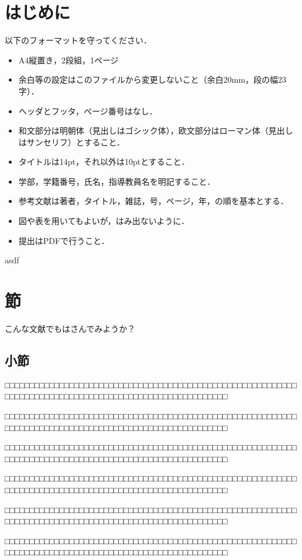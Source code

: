 

\section{はじめに}
以下のフォーマットを守ってください．
\begin{itemize}
\item
A4縦置き，2段組，1ページ
\item
余白等の設定はこのファイルから変更しないこと（余白20mm，段の幅23字）．
\item
ヘッダとフッタ，ページ番号はなし．
\item
和文部分は明朝体（見出しはゴシック体），欧文部分はローマン体（見出しはサンセリフ）とすること．
\item
タイトルは14pt，それ以外は10ptとすること．
\item
学部，学籍番号，氏名，指導教員名を明記すること．
\item
参考文献は著者，タイトル，雑誌，号，ページ，年，の順を基本とする．
\item
図や表を用いてもよいが，はみ出ないように．
\item
提出はPDFで行うこと．
\end{itemize}
asdf
\section{節}
こんな文献でもはさんでみようか\cite{Dazai}？
\subsection{小節}

□□□□□□□□□□□□□□□□□□□□□□□□□□□□□□□□□□□□□□□□□□□□□□□□□□□□□□□□□□□□□□□□□□□□□□□□□□□□□□□□□□□□□□□□□□□□□□□□□□□□□□□□

□□□□□□□□□□□□□□□□□□□□□□□□□□□□□□□□□□□□□□□□□□□□□□□□□□□□□□□□□□□□□□□□□□□□□□□□□□□□□□□□□□□□□□□□□□□□□□□□□□□□□□□□

□□□□□□□□□□□□□□□□□□□□□□□□□□□□□□□□□□□□□□□□□□□□□□□□□□□□□□□□□□□□□□□□□□□□□□□□□□□□□□□□□□□□□□□□□□□□□□□□□□□□□□□□

□□□□□□□□□□□□□□□□□□□□□□□□□□□□□□□□□□□□□□□□□□□□□□□□□□□□□□□□□□□□□□□□□□□□□□□□□□□□□□□□□□□□□□□□□□□□□□□□□□□□□□□□

□□□□□□□□□□□□□□□□□□□□□□□□□□□□□□□□□□□□□□□□□□□□□□□□□□□□□□□□□□□□□□□□□□□□□□□□□□□□□□□□□□□□□□□□□□□□□□□□□□□□□□□□

□□□□□□□□□□□□□□□□□□□□□□□□□□□□□□□□□□□□□□□□□□□□□□□□□□□□□□□□□□□□□□□□□□□□□□□□□□□□□□□□□□□□□□□□□□□□□□□□□□□□□□□□

